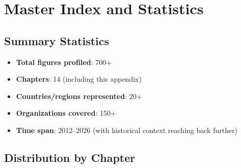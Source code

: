 
\chapter{Master Index and Statistics}
\label{ch:appendix}



\section{Summary Statistics}
\label{sec:appendix-stats}

\begin{corebox}
\begin{itemize}
  \item \textbf{Total figures profiled}: 700+
  \item \textbf{Chapters}: 14 (including this appendix)
  \item \textbf{Countries/regions represented}: 20+
  \item \textbf{Organizations covered}: 150+
  \item \textbf{Time span}: 2012--2026 (with historical context reaching back further)
\end{itemize}
\end{corebox}


\section{Distribution by Chapter}
\label{sec:appendix-distribution}

